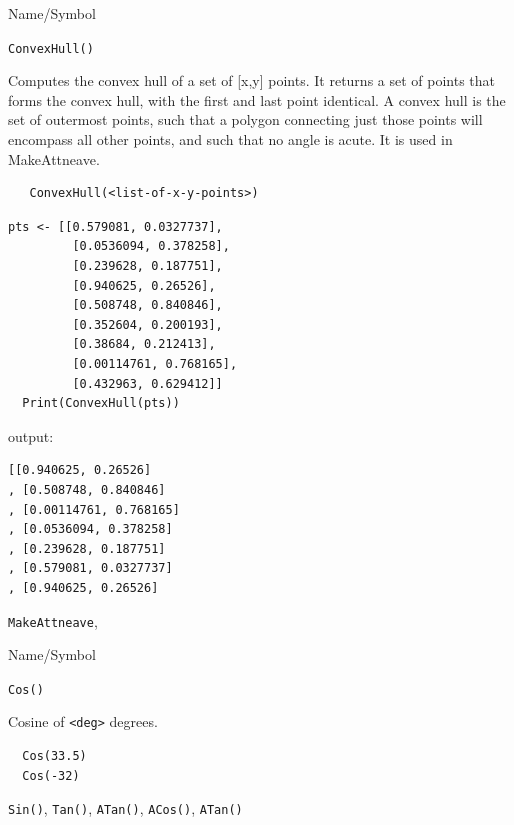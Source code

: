 \begin{desc}{Name/Symbol}
\item[Name/Symbol] \verb+ConvexHull()+

\item[Description]	Computes the convex hull of a set of [x,y]
  points. It returns a set of points that forms the convex hull, with
  the first and last point identical.  A convex hull is the set of
  outermost points, such that a polygon connecting just those points
  will encompass all other points, and such that no angle is acute.
  It is used in MakeAttneave.

\item[Usage]
\begin{verbatim}
   ConvexHull(<list-of-x-y-points>)
\end{verbatim}

\item[Example]	
\begin{verbatim} 
pts <- [[0.579081, 0.0327737], 
         [0.0536094, 0.378258], 
         [0.239628, 0.187751], 
         [0.940625, 0.26526], 
         [0.508748, 0.840846],
         [0.352604, 0.200193], 
         [0.38684, 0.212413],
         [0.00114761, 0.768165],
         [0.432963, 0.629412]]
  Print(ConvexHull(pts))

\end{verbatim}

output:
\begin{verbatim}
[[0.940625, 0.26526]
, [0.508748, 0.840846]
, [0.00114761, 0.768165]
, [0.0536094, 0.378258]
, [0.239628, 0.187751]
, [0.579081, 0.0327737]
, [0.940625, 0.26526]

\end{verbatim}


\item[See Also]
  \verb+MakeAttneave+,

\end{desc}




\begin{desc}{Name/Symbol}
\item[Name/Symbol]  	\verb+Cos()+
			 
\item[Description] 	Cosine of \verb+<deg>+ degrees.

\item[Usage]		
\item[Example]	
\begin{verbatim}
  Cos(33.5)
  Cos(-32)
\end{verbatim}

\item[See Also]     	\verb+Sin()+, \verb+Tan()+, \verb+ATan()+, \verb+ACos()+, \verb+ATan()+
\end{desc}


